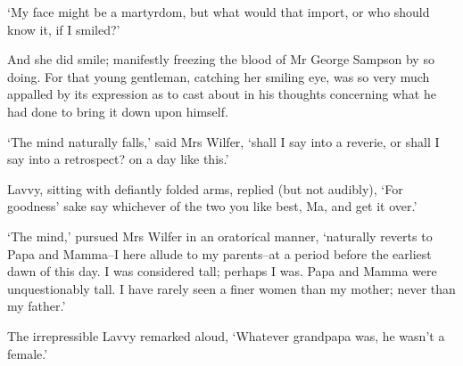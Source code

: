 ‘My face might be a martyrdom, but what would that import, or who should
know it, if I smiled?’

And she did smile; manifestly freezing the blood of Mr George Sampson
by so doing. For that young gentleman, catching her smiling eye, was so
very much appalled by its expression as to cast about in his thoughts
concerning what he had done to bring it down upon himself.

‘The mind naturally falls,’ said Mrs Wilfer, ‘shall I say into a
reverie, or shall I say into a retrospect? on a day like this.’

Lavvy, sitting with defiantly folded arms, replied (but not audibly),
‘For goodness’ sake say whichever of the two you like best, Ma, and get
it over.’

‘The mind,’ pursued Mrs Wilfer in an oratorical manner, ‘naturally
reverts to Papa and Mamma--I here allude to my parents--at a period
before the earliest dawn of this day. I was considered tall; perhaps I
was. Papa and Mamma were unquestionably tall. I have rarely seen a finer
women than my mother; never than my father.’

The irrepressible Lavvy remarked aloud, ‘Whatever grandpapa was, he
wasn’t a female.’

